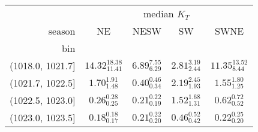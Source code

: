 \begin{tabular}{@{\extracolsep\fill}rcccc}
\toprule
{} & \multicolumn{4}{c}{median $K_T$} \\
season &                       NE &                  NESW &                    SW &                    SWNE \\
bin              &                          &                       &                       &                         \\
\midrule
(1018.0, 1021.7] &  $14.32_{11.41}^{18.38}$ &  $6.89_{6.29}^{7.55}$ &  $2.81_{2.44}^{3.19}$ &  $11.35_{8.44}^{13.52}$ \\
(1021.7, 1022.5] &     $1.70_{1.48}^{1.91}$ &  $0.40_{0.34}^{0.46}$ &  $2.19_{1.93}^{2.45}$ &    $1.55_{1.25}^{1.80}$ \\
(1022.5, 1023.0] &     $0.26_{0.25}^{0.28}$ &  $0.21_{0.19}^{0.22}$ &  $1.52_{1.31}^{1.68}$ &    $0.62_{0.52}^{0.72}$ \\
(1023.0, 1023.5] &     $0.18_{0.17}^{0.18}$ &  $0.21_{0.20}^{0.22}$ &  $0.46_{0.42}^{0.52}$ &    $0.22_{0.20}^{0.25}$ \\
\bottomrule
\end{tabular}
